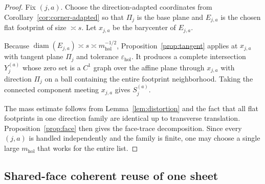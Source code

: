 \documentclass[11pt]{article}
\numberwithin{equation}{section}
\theoremstyle{plain}
\theoremstyle{definition}
\theoremstyle{remark}
\DeclareMathOperator{\diam}{diam}
\newcommand{\eps}{\varepsilon}
\newcommand{\mhol}{m_{\mathrm{hol}}}
\begin{document}
\begin{proof}
Fix $(j,a)$.  Choose the direction-adapted coordinates from Corollary~\ref{cor:corner-adapted} so that $\Pi_j$ is the base plane and $E_{j,a}$ is the chosen flat footprint of size $\asymp s$.  Let $x_{j,a}$ be the barycenter of $E_{j,a}$.

Because $\diam(E_{j,a})\asymp s\asymp \mhol^{-1/2}$, Proposition~\ref{prop:tangent} applies at $x_{j,a}$ with tangent plane $\Pi_j$ and tolerance $\eps_{\mathrm{hol}}$.  It produces a complete intersection $Y_j^{(a)}$ whose zero set is a $C^1$ graph over the affine plane through $x_{j,a}$ with direction $\Pi_j$ on a ball containing the entire footprint neighborhood.  Taking the connected component meeting $x_{j,a}$ gives $S_j^{(a)}$.

The mass estimate follows from Lemma~\ref{lem:distortion} and the fact that all flat footprints in one direction family are identical up to transverse translation.  Proposition~\ref{prop:face} then gives the face-trace decomposition.  Since every $(j,a)$ is handled independently and the family is finite, one may choose a single large $\mhol$ that works for the entire list.
\end{proof}

\subsection{Shared-face coherent reuse of one sheet}
\end{document}
